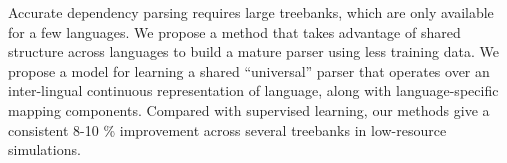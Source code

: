 Accurate dependency parsing requires large treebanks, which are only available for a few languages. We propose a method that takes advantage of shared structure across languages to build a mature parser using less training data. We propose a model for learning a shared ``universal'' parser that operates over an inter-lingual continuous representation of language, along with language-specific mapping components. Compared with supervised learning, our methods give a consistent 8-10 \% improvement across several treebanks in low-resource simulations.
